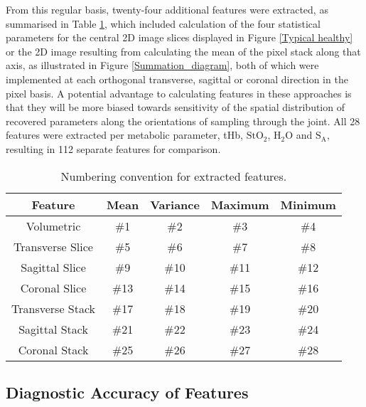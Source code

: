 \documentclass[twoside]{bhamthesis}
\theoremstyle{definition}
\begin{document}
From this regular basis, twenty-four additional features were extracted, as summarised in Table \ref{tab:Numbering convention}, which included calculation of the four statistical parameters for the central 2D image slices displayed in Figure \ref{Typical healthy} or the 2D image resulting from calculating the mean of the pixel stack along that axis, as illustrated in Figure \ref{Summation_diagram}, both of which were implemented at each orthogonal transverse, sagittal or coronal direction in the pixel basis.  A potential advantage to calculating features in these approaches is that they will be more biased towards sensitivity of the spatial distribution of recovered parameters along the orientations of sampling through the joint.  All 28 features were extracted per metabolic parameter, tHb, $\mathrm{StO_2}$, $\mathrm{H_2O}$ and $\mathrm{S_A}$, resulting in 112 separate features for comparison.  

\begin{table}[!ht]
\caption{Numbering convention for extracted features.} 
\label{tab:Numbering convention}
\begin{center}       
\begin{tabular}{c c c c c }
\hline
\rule[-1ex]{0pt}{3.5ex}  Feature & Mean & Variance & Maximum & Minimum \\
\hline
\rule[-1ex]{0pt}{3.5ex}  Volumetric & \#1 & \#2 & \#3  &  \#4 \\
\rule[-1ex]{0pt}{3.5ex}  Transverse Slice & \#5 & \#6 & \#7  &  \#8 \\
\rule[-1ex]{0pt}{3.5ex}  Sagittal Slice & \#9 & \#10 & \#11  &  \#12 \\
\rule[-1ex]{0pt}{3.5ex}  Coronal Slice & \#13 & \#14 & \#15  &  \#16 \\
\rule[-1ex]{0pt}{3.5ex}  Transverse Stack & \#17 & \#18 & \#19  &  \#20 \\
\rule[-1ex]{0pt}{3.5ex}  Sagittal Stack & \#21 & \#22 & \#23  &  \#24 \\
\rule[-1ex]{0pt}{3.5ex}  Coronal Stack & \#25 & \#26 & \#27  &  \#28 \\
\hline
\end{tabular}
\end{center}
\end{table} 

\subsection{Diagnostic Accuracy of Features}

\end{document}

